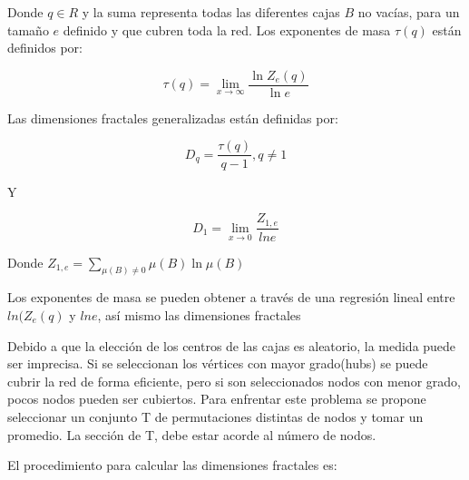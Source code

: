 Donde $q\in R$ y la suma representa todas las diferentes cajas $B$ no vacías, para un tamaño $e$ definido y que cubren toda la red. Los exponentes de masa $\tau(q)$ están definidos por:

\begin{equation}
    \tau(q) = \lim_{x \to \infty} \frac{\ln Z_e(q)}{\ln e}
\end{equation}

Las dimensiones fractales generalizadas están definidas por:

\begin{equation}
    D_q = \frac{\tau(q)}{q-1}, q \neq 1
\end{equation}

Y

\begin{equation}
    D_1 = \lim_{x \to 0} \frac{Z_{1,e}}{ln e}
\end{equation}

Donde $Z_{1,e} = \sum \limits_{\mu(B) \neq 0} \mu(B) \ln \mu(B)$

Los exponentes de masa se pueden obtener a través de una regresión lineal entre $ln(Z_e(q)$ y $ln e$, así mismo las dimensiones fractales 

Debido a que la elección de los centros de las cajas es aleatorio, la medida puede ser imprecisa. Si se seleccionan los vértices con mayor grado(hubs) se puede cubrir la red de forma eficiente, pero si son seleccionados nodos con menor grado, pocos nodos pueden ser cubiertos. Para enfrentar este problema se propone seleccionar un conjunto T de permutaciones distintas de nodos y tomar un promedio. La sección de T, debe estar acorde al número de nodos.

El procedimiento para calcular las dimensiones fractales es:

